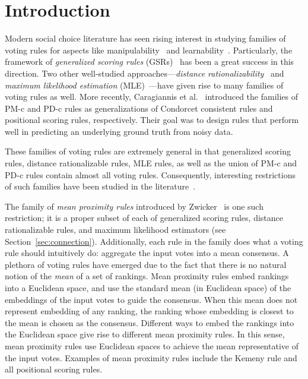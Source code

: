 \documentclass[prodmode]{acmsmall-ec14}
\newcommand{\kibitz}[2]{\ifnum\Comments=1\textcolor{#1}{#2}\fi}
\newcommand{\ns}[1]{\kibitz{red} {[NS: #1]}}
\begin{document}
\section{Introduction}
\label{sec:intro}
Modern social choice literature has seen rising interest in studying families of voting rules for aspects like manipulability~\cite{Gib73,Sat75,Xia13} and learnability~\cite{PZR08,PZPR09}. Particularly, the framework of \emph{generalized scoring rules} (GSRs)~\cite{XC08} has been a great success in this direction. Two other well-studied approaches---\emph{distance rationalizability}~\cite{MN08,EFS09,elkind2010good} and \emph{maximum likelihood estimation} (MLE)~\cite{Con85,Young88,CS05b}---have given rise to many families of voting rules as well. More recently, Caragiannis et al.~ introduced the families of \mbox{PM-c} and \mbox{PD-c} rules as generalizations of Condorcet consistent rules and positional scoring rules, respectively. Their goal was to design rules that perform well in predicting an underlying ground truth from noisy data. 

These families of voting rules are extremely general in that generalized scoring rules, distance rationalizable rules, MLE rules, as well as the union of \mbox{PM-c} and \mbox{PD-c} rules contain almost all voting rules. Consequently, interesting restrictions of such families have been studied in the literature~\cite{CPS14,EFS09,elkind2010good,CS05b}. 


The family of \emph{mean proximity rules} introduced by Zwicker~ is one such restriction; it is a proper subset of each of generalized scoring rules, distance rationalizable rules, and maximum likelihood estimators (see Section~\ref{sec:connection}). Additionally, each rule in the family does what a voting rule should intuitively do: aggregate the input votes into a mean consensus. A plethora of voting rules have emerged due to the fact that there is no natural notion of the \emph{mean} of a set of rankings. Mean proximity rules embed rankings into a Euclidean space, and use the standard mean (in Euclidean space) of the embeddings of the input votes to guide the consensus. When this mean does not represent embedding of any ranking, the ranking whose embedding is closest to the mean is chosen as the consensus. Different ways to embed the rankings into the Euclidean space give rise to different mean proximity rules. In this sense, mean proximity rules use Euclidean spaces to achieve the mean representative of the input votes. Examples of mean proximity rules include the Kemeny rule and all positional scoring rules. 
\end{document}

